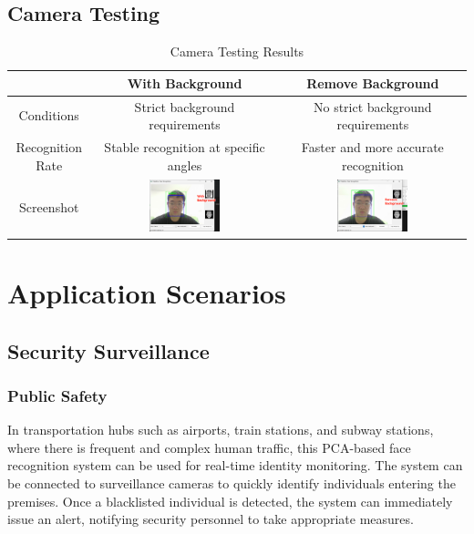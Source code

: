 \documentclass{article}
\begin{document}
\subsection{Camera Testing}

\begin{table}[H]
    \centering
    \begin{tabular}{|c|c|c|}
        \hline
        & With Background & Remove Background \\
        \hline
        Conditions & Strict background requirements & No strict background requirements \\
        \hline
        Recognition Rate & Stable recognition at specific angles & Faster and more accurate recognition \\
        \hline
        Screenshot & \includegraphics[width=0.4\textwidth]{Img/PixPin_2025-03-09_11-53-03.png} & \includegraphics[width=0.4\textwidth]{Img/PixPin_2025-03-09_11-54-41.png} \\
        \hline
    \end{tabular}
    \caption{Camera Testing Results}
\end{table}
\newpage
\section{Application Scenarios}

\subsection{Security Surveillance}

\subsubsection{Public Safety}
In transportation hubs such as airports, train stations, and subway stations, where there is frequent and complex human traffic, this PCA-based face recognition system can be used for real-time identity monitoring. The system can be connected to surveillance cameras to quickly identify individuals entering the premises. Once a blacklisted individual is detected, the system can immediately issue an alert, notifying security personnel to take appropriate measures.
\end{document}
